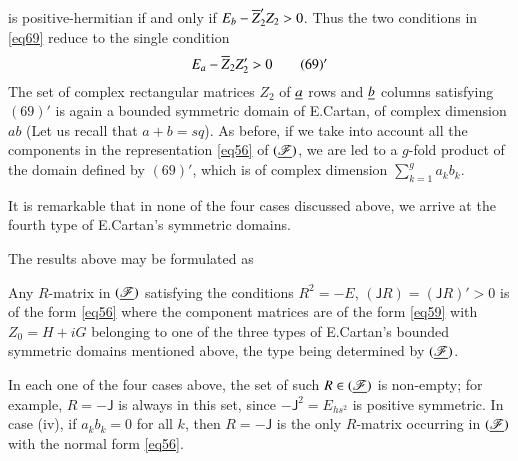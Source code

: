 is positive-hermitian if and only if $E_{b}-\overline{Z}'_{2}Z_{2}>0$. Thus
the two conditions in \eqref{eq69} reduce to the single condition
\begin{equation*}
E_{a}-\overline{Z}_{2}Z'_{2}>0\tag*{$(69)'$}
\end{equation*}
The set of complex rectangular matrices $Z_{2}$ of $\underline{a}$ rows and
$\underline{b}$ columns satisfying $(69)'$ is again a bounded symmetric
domain of E.\@ Cartan, of complex dimension $ab$ (Let us recall that
$a+b=sq$). As before, if we take into account all the components in
the representation \eqref{eq56} of $(\underline{\mathscr{F}})$, we are led to a
$g$-fold product of the domain defined by $(69)'$, which is of complex
dimension $\sum\limits^{g}_{k=1} a_{k}b_{k}$.

It is remarkable that in none of the four cases discussed above, we
arrive at the fourth type of E.\@ Cartan's symmetric domains.

The results above may be formulated as

\begin{thm}\label{thm6}
Any $R$-matrix in $(\underline{\mathscr{F}})$ satisfying the conditions
$R^{2}=-E$, $(\mathsf{J}R)=(\mathsf{J}R)'>0$ is of the form \eqref{eq56}
where the component matrices are of the form \eqref{eq59} with
$Z_{0}=H+iG$ belonging to one of the three types of E.\@ Cartan's
bounded symmetric domains mentioned above, the type being determined
by $(\underline{\mathscr{F}})$. 
\end{thm}

In each one of the four cases above, the set of such
$R\in(\underline{\mathscr{F}})$ is non-empty; for example, $R=-\mathsf{J}$ is
always in this set, since $-\mathsf{J}^{2}=E_{hs^{2}}$\pageoriginale
is positive symmetric. In case (iv), if $a_{k}b_{k}=0$ for all $k$,
then $R=-\mathsf{J}$ is the only $R$-matrix occurring in
$(\underline{\mathscr{F}})$ with the normal form \eqref{eq56}.

